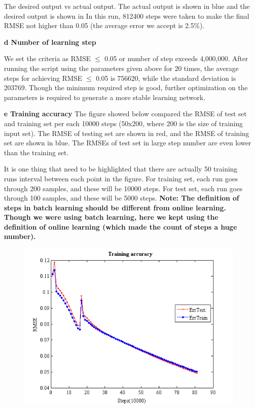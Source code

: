 \documentclass[epsfig]{article}
\def\bpar{\vskip26pt}
\def\npar{\vskip13pt}
\def\spar{\vskip10pt}
\begin{document}
The desired output vs actual output. The actual output is shown in blue and the desired output is shown in  In this run, 812400 steps were taken to make the final RMSE not higher than 0.05 (the average error we accept is 2.5\%).

{\bf 
	\npar
	d Number of learning step
	\bpar
}

We set the criteria as RMSE $\le$ 0.05 or number of step exceeds 4,000,000. After running the script using the parameters given above for 20 times, the average steps for achieving RMSE $\le$ 0.05 is 756620, while the standard deviation is 203769. Though the minimum required step is good, further optimization on the parameters is required to generate a more stable learning network.
\spar

{\bf 
	\npar
	e Training accuracy
	\bpar
}
The figure showed below compared the RMSE of test set and training set per each 10000 steps (50x200, where 200 is the size of training input set). The RMSE of testing set are shown in red, and the RMSE of training set are shown in blue. The RMSEs of test set in large step number are even lower than the training set.

It is one thing that need to be highlighted that there are actually 50 training runs interval between each point in the figure. For training set, each run goes through 200 samples, and these will be 10000 steps. For test set, each run goes through 100 samples, and these will be 5000 steps. 
\spar
{\bf Note: The definition of steps in batch learning should be different from online learning. Though we were using batch learning, here we kept using the definition of online learning (which made the count of steps a huge number).} 

\begin{figure}[!htb] 
	\centering\includegraphics[width=4.5in]{fig3.png} 
\end{figure} 
\end{document}
